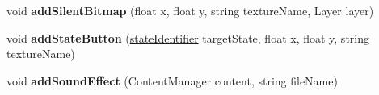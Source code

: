 \begin{DoxyCompactItemize}
\item 
\hypertarget{classwp__engine_1_1_state_ade2cc3e6fe0619d9727511599abebedf}{void {\bfseries add\-Silent\-Bitmap} (float x, float y, string texture\-Name, Layer layer)}\label{classwp__engine_1_1_state_ade2cc3e6fe0619d9727511599abebedf}

\item 
\hypertarget{classwp__engine_1_1_state_a6fc3e1da80ea7ca94223c0cdff25bc05}{void {\bfseries add\-State\-Button} (\hyperlink{namespacewp__engine_aae123481cdcc6dc4c4474c1b0b62b152}{state\-Identifier} target\-State, float x, float y, string texture\-Name)}\label{classwp__engine_1_1_state_a6fc3e1da80ea7ca94223c0cdff25bc05}

\item 
\hypertarget{classwp__engine_1_1_state_a437af65520e3d7eb5c3e64221a4019f9}{void {\bfseries add\-Sound\-Effect} (Content\-Manager content, string file\-Name)}\label{classwp__engine_1_1_state_a437af65520e3d7eb5c3e64221a4019f9}

\end{DoxyCompactItemize}
